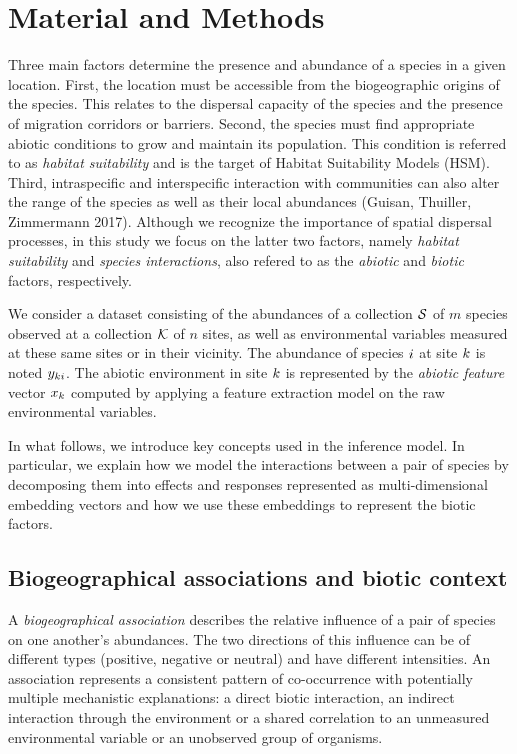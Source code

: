 \documentclass[10pt,a4paper]{article}
\begin{document}
\section{Material and Methods}
Three main factors determine the presence and abundance of a species
in a given location.  First, the location must be accessible from the
biogeographic origins of the species. This relates to the dispersal
capacity of the species and the presence of migration corridors or
barriers.  Second, the species must find appropriate abiotic
conditions to grow and maintain its population. This condition is
referred to as \textit{habitat suitability} and is the target of
Habitat Suitability Models (HSM). Third, intraspecific and
interspecific interaction with communities can also alter the range of
the species as well as their local abundances (Guisan, Thuiller,
Zimmermann 2017). Although we recognize the importance of spatial dispersal processes,
in this study we focus on the latter two factors, namely \emph{habitat suitability} and \emph{species interactions}, also refered to as the \emph{abiotic} and \emph{biotic} factors, respectively.


We consider a dataset consisting of the abundances of a collection $\mathcal{S}$ of $m$ species observed at a collection $\mathcal{K}$ of $n$ sites, as well as environmental variables measured at these same sites or in their vicinity.
The abundance of species $i$ at site $k$ is noted $y_{ki}$.
The abiotic environment in site $k$ is represented by the \emph{abiotic feature} vector $x_{k}$ computed by applying a feature extraction model on the raw environmental variables.


In what follows, we introduce key concepts used in the inference model.
In particular, we explain how we model the interactions between a pair of species by decomposing them into effects and responses represented as multi-dimensional embedding vectors and how we use these embeddings to represent the biotic factors.

\subsection{Biogeographical associations and biotic context}

A \textit{biogeographical association} describes the relative
influence of a pair of species on one another's abundances.  The two
directions of this influence can be of different types (positive,
negative or neutral) and have different intensities.  An association
represents a consistent pattern of co-occurrence with potentially
multiple mechanistic explanations: a direct biotic interaction, an indirect
interaction through the environment or a shared correlation to an
unmeasured environmental variable or an unobserved group of organisms.
\end{document}
